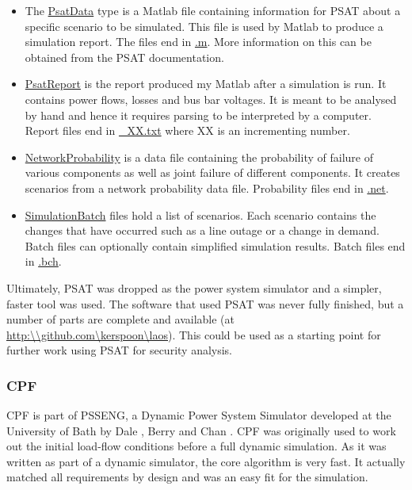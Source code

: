 \documentclass[a4paper,oneside,12pt]{report}
\begin{document}
\begin{itemize}

\item The \underline{PsatData} type is a Matlab file containing information for PSAT about a specific scenario to be simulated. This file is used by Matlab to produce a simulation report. The files end in \underline{.m}. More information on this can be obtained from the PSAT documentation.

\item \underline{PsatReport} is the report produced my Matlab after a simulation is run. It contains power flows, losses and bus bar voltages. It is meant to be analysed by hand and hence it requires parsing to be interpreted by a computer. Report files end in \underline{\_XX.txt} where XX is an incrementing number.

 \item \underline{NetworkProbability} is a data file containing the probability of failure of various components as well as joint failure of different components. It creates scenarios from a network probability data file. Probability files end in \underline{.net}.

\item \underline{SimulationBatch} files hold a list of scenarios. Each scenario contains the changes that have occurred such as a line outage or a change in demand. Batch files can optionally contain simplified simulation results. Batch files end in \underline{.bch}.
\end{itemize}

Ultimately, PSAT was dropped as the power system simulator and a simpler, faster tool was used. The software that used PSAT was never fully finished, but a number of parts are complete and available (at \url{http:\\github.com\kerspoon\laos}). This could be used as a starting point for further work using PSAT for security analysis.

\subsubsection{CPF}

CPF is part of PSSENG, a Dynamic Power System Simulator developed at the University of Bath by 
Dale \cite{Dale1986}, Berry \cite{Berry1989} and Chan \cite{Chan1992}. CPF was originally used to work out the initial load-flow conditions before a full dynamic simulation. As it was written as part of a dynamic simulator, the core algorithm is very fast. It actually matched all requirements by design and was an easy fit for the simulation. 
\end{document}
